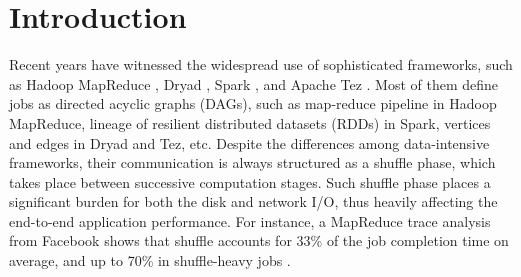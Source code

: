 \section{Introduction}
\ifrevision
\reversemarginpar
{}
\fi
Recent years have witnessed the widespread use of sophisticated frameworks, such as Hadoop MapReduce \cite{hadoop}, Dryad \cite{dryad}, Spark \cite{spark}, and Apache Tez \cite{tez}.
Most of them define jobs as directed acyclic graphs (DAGs), such as map-reduce pipeline in Hadoop MapReduce, lineage of resilient distributed datasets (RDDs) in Spark, vertices and edges in Dryad and Tez, etc.
Despite the differences among data-intensive frameworks, their communication is always structured as a shuffle phase,  which takes place between successive computation stages. 
Such shuffle phase places a significant burden for both the disk and network I/O, thus heavily affecting the end-to-end application performance. 
For instance, a MapReduce trace analysis from Facebook shows that shuffle accounts for 33\% of the job completion time on average, and up to 70\% in shuffle-heavy jobs \cite{managing}.

